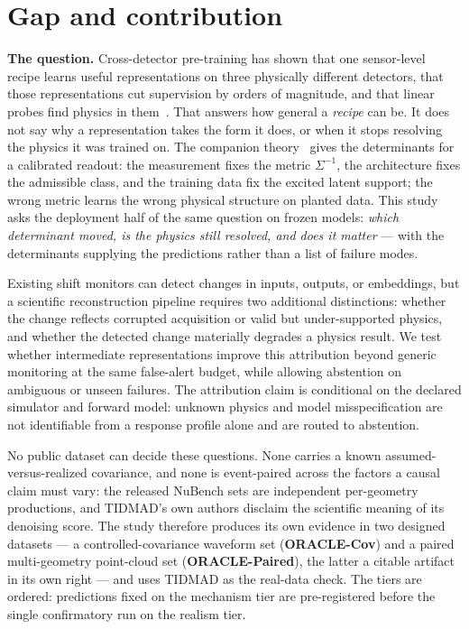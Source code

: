 \documentclass[10pt,twocolumn]{extarticle}
\begin{document}
\section{Gap and contribution}

\textbf{The question.} Cross-detector pre-training has shown that one
sensor-level recipe learns useful representations on three physically
different detectors, that those representations cut supervision by orders of
magnitude, and that linear probes find physics in them~\cite{panda2}. That
answers how general a \emph{recipe} can be. It does not say why a
representation takes the form it does, or when it stops resolving the physics
it was trained on. The companion theory~\cite{paper1} gives the determinants
for a calibrated readout: the measurement fixes the metric $\Sigma^{-1}$, the
architecture fixes the admissible class, and the training data fix the
excited latent support; the wrong metric learns the wrong physical structure
on planted data. This study asks the deployment half of the same question on
frozen models: \emph{which determinant moved, is the physics still resolved,
and does it matter} --- with the determinants supplying the predictions rather
than a list of failure modes.

Existing shift monitors can detect changes in inputs, outputs, or embeddings,
but a scientific reconstruction pipeline requires two additional distinctions:
whether the change reflects corrupted acquisition or valid but under-supported
physics, and whether the detected change materially degrades a physics result.
We test whether intermediate representations improve this attribution beyond
generic monitoring at the same false-alert budget, while allowing abstention on
ambiguous or unseen failures. The attribution claim is conditional on the
declared simulator and forward model: unknown physics and model
misspecification are not identifiable from a response profile alone and are
routed to abstention.

No public dataset can decide these questions. None carries a known
assumed-versus-realized covariance, and none is event-paired across the factors
a causal claim must vary: the released NuBench sets are independent
per-geometry productions, and TIDMAD's own authors disclaim the scientific
meaning of its denoising score. The study therefore produces its own evidence
in two designed datasets --- a controlled-covariance waveform set
(\textbf{ORACLE-Cov}) and a paired multi-geometry point-cloud set
(\textbf{ORACLE-Paired}), the latter a citable artifact in its own right ---
and uses TIDMAD as the real-data check. The tiers are ordered: predictions
fixed on the mechanism tier are pre-registered before the single confirmatory
run on the realism tier.
\end{document}
